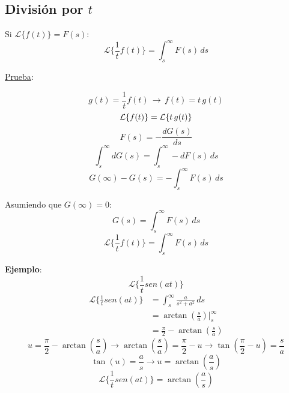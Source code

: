 \subsection{División por $t$}
Si $\mathcal{L}\{f(t)\}=F(s)$:
\begin{equation}
    \mathcal{L}\biggl\{\frac{1}{t}f(t)\biggl\}=\int_s^{\infty}F(s)\,ds
\end{equation}

\underline{Prueba}:

\begin{equation*}
    g(t)=\frac{1}{t}f(t)\,\rightarrow\,f(t)=t\,g(t)
\end{equation*}
\begin{equation*}
    \mathcal{L}\{f(t)\}=\mathcal{L}\{t\,g(t)\}\\
\end{equation*}
\begin{equation*}
    F(s)=-\frac{dG(s)}{ds}
\end{equation*}
\begin{equation*}
    \int_s^{\infty}dG(s)=\int_s^{\infty}-dF(s)\,ds
\end{equation*}
\begin{equation*}
    G(\infty)-G(s)=-\int_s^{\infty}F(s)\,ds
\end{equation*}

Asumiendo que $G(\infty)=0$:
\begin{equation*}
    G(s)=\int_s^{\infty}F(s)\,ds
\end{equation*}
\begin{equation*}
    \mathcal{L}\biggl\{\frac{1}{t}f(t)\biggl\}=\int_s^{\infty}F(s)\,ds
\end{equation*}

\textbf{Ejemplo}:
\begin{equation*}
    \mathcal{L}\biggl\{\frac{1}{t}sen(at)\biggl\}
\end{equation*}
\begin{equation*}
\begin{split}
    \mathcal{L}\biggl\{\frac{1}{t}sen(at)\biggl\}
        &=\int_s^{\infty}\frac{a}{s^2+a^2}\,ds\\
        &=\arctan\left(\frac{s}{a}\right)\Biggr|_s^{\infty}\\
        &=\frac{\pi}{2}-\arctan\left(\frac{s}{a}\right)
\end{split}
\end{equation*}
\begin{equation*}
    u=\frac{\pi}{2}-\arctan\left(\frac{s}{a}\right)
    \rightarrow
    \arctan\left(\frac{s}{a}\right)=\frac{\pi}{2}-u
    \rightarrow
    \tan\left(\frac{\pi}{2}-u\right)=\frac{s}{a}
\end{equation*}
\begin{equation*}
    \tan(u)=\frac{a}{s}
    \rightarrow
    u=\arctan\left(\frac{a}{s}\right)
\end{equation*}
\begin{equation*}
    \mathcal{L}\biggl\{\frac{1}{t}sen(at)\biggl\}
        =\arctan\left(\frac{a}{s}\right)
\end{equation*}

